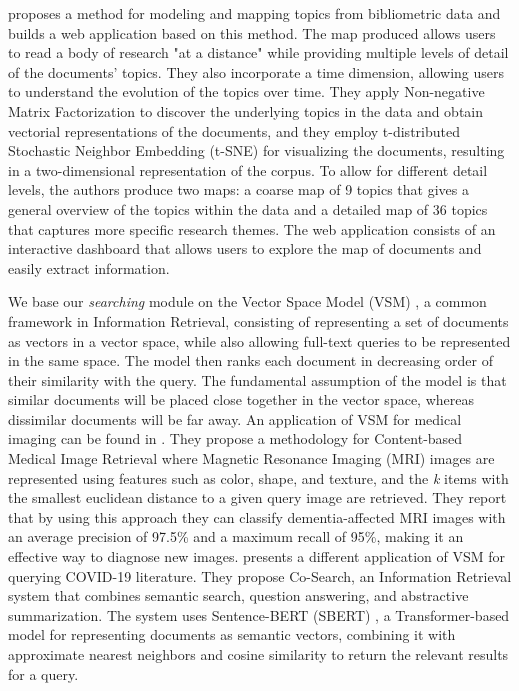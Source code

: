\documentclass[a4paper]{article}
\begin{document}
\citep{lafia2021a} proposes a method for modeling and mapping topics from bibliometric data and builds a web application based on this method. The map produced allows users to read a body of research "at a distance" while providing multiple levels of detail of the documents' topics. They also incorporate a time dimension, allowing users to understand the evolution of the topics over time. They apply Non-negative Matrix Factorization \citep{lee1999} to discover the underlying topics in the data and obtain vectorial representations of the documents, and they employ t-distributed Stochastic Neighbor Embedding (t-SNE) \citep{vandermaaten2008} for visualizing the documents, resulting in a two-dimensional representation of the corpus. To allow for different detail levels, the authors produce two maps: a coarse map of 9 topics that gives a general overview of the topics within the data and a detailed map of 36 topics that captures more specific research themes. The web application consists of an interactive dashboard that allows users to explore the map of documents and easily extract information.

We base our \emph{searching} module on the Vector Space Model (VSM) \citep[p.~120-126]{schutze2008}, a common framework in Information Retrieval, consisting of representing a set of documents as vectors in a vector space, while also allowing full-text queries to be represented in the same space. The model then ranks each document in decreasing order of their similarity with the query. The fundamental assumption of the model is that similar documents will be placed close together in the vector space, whereas dissimilar documents will be far away. An application of VSM for medical imaging can be found in \citep{sampathila2020}. They propose a methodology for Content-based Medical Image Retrieval where Magnetic Resonance Imaging (MRI) images are represented using features such as color, shape, and texture, and the \emph{k} items with the smallest euclidean distance to a given query image are retrieved. They report that by using this approach they can classify dementia-affected MRI images with an average precision of 97.5\% and a maximum recall of 95\%, making it an effective way to diagnose new images. \citep{esteva2020} presents a different application of VSM for querying COVID-19 literature. They propose Co-Search, an Information Retrieval system that combines semantic search, question answering, and abstractive summarization. The system uses Sentence-BERT (SBERT) \citep{reimers2019}, a Transformer-based model for representing documents as semantic vectors, combining it with approximate nearest neighbors and cosine similarity to return the relevant results for a query.
\end{document}
